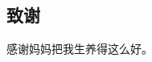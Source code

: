 \documentclass[twoside]{CUGThesis}
\begin{document}
\begin{spacing}{2}
	\section*{致谢}
	感谢妈妈把我生养得这么好。
\end{spacing}
{}

\clearpage


{}
\end{document}
